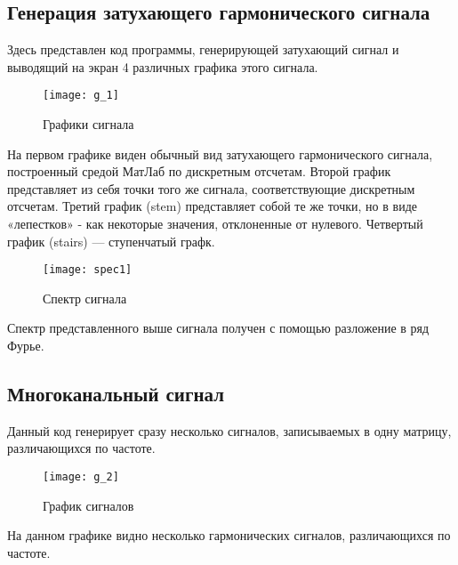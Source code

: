 \subsection{Генерация затухающего гармонического сигнала}


\parindent=1cm
Здесь представлен код программы, генерирующей затухающий сигнал и выводящий на экран 4 различных графика этого сигнала.

\begin{figure}[H]
	\begin{center}
		\texttt{[image: g\_1]}
		\caption{Графики сигнала} 
		\label{pic:g_1} %
	\end{center}
\end{figure}
На первом графике виден обычный вид затухающего гармонического сигнала, построенный средой МатЛаб по дискретным отсчетам. Второй график представляет из себя точки того же сигнала, соответствующие дискретным отсчетам. Третий график (stem) представляет собой те же точки, но в виде «лепестков» - как некоторые значения, отклоненные от нулевого. Четвертый график (stairs) — ступенчатый графк.

\begin{figure}[H]
	\begin{center}
		\texttt{[image: spec1]}
		\caption{Спектр сигнала} 
		\label{pic:spec1} %
	\end{center}
\end{figure}
Спектр представленного выше сигнала получен с помощью разложение в ряд Фурье.

\subsection{Многоканальный сигнал}


\parindent=1cm
Данный код генерирует сразу несколько сигналов, записываемых в одну матрицу, различающихся по частоте.

\begin{figure}[H]
	\begin{center}
		\texttt{[image: g\_2]}
		\caption{График сигналов} 
		\label{pic:g_2} %
	\end{center}
\end{figure}
На данном графике видно несколько гармонических сигналов, различающихся по частоте.

